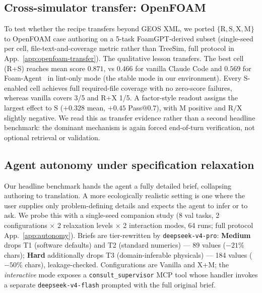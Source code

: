 \documentclass{article}
\begin{document}
\subsection{Cross-simulator transfer: OpenFOAM}
\label{subsec:openfoam-transfer}

To test whether the recipe transfers beyond GEOS XML, we ported $\{\mathrm{R,S,X,M}\}$ to OpenFOAM case authoring on a 5-task FoamGPT-derived subset (single-seed per cell, file-text-and-coverage metric rather than TreeSim, full protocol in App.~\ref{app:openfoam-transfer}). The qualitative lesson transfers. The best cell (R+S) reaches mean score $0.871$, vs $0.466$ for vanilla Claude Code and $0.569$ for Foam-Agent~\citep{foamagent2025} in lint-only mode (the stable mode in our environment). Every $\mathrm{S}$-enabled cell achieves full required-file coverage with no zero-score failures, whereas vanilla covers 3/5 and R+X 1/5. A factor-style readout assigns the largest effect to $\mathrm{S}$ ($+0.328$ mean, $+0.45$ Pass@0.7), with $\mathrm{M}$ positive and $\mathrm{R}/\mathrm{X}$ slightly negative. We read this as transfer evidence rather than a second headline benchmark: the dominant mechanism is again forced end-of-turn verification, not optional retrieval or validation.

\subsection{Agent autonomy under specification relaxation}
\label{subsec:autonomy}

Our headline benchmark hands the agent a fully detailed brief, collapsing authoring to translation. A more ecologically realistic setting is one where the user supplies only problem-defining details and expects the agent to infer or to ask. We probe this with a single-seed companion study (8 val tasks, 2 configurations $\times$ 2 relaxation levels $\times$ 2 interaction modes, 64 runs; full protocol App.~\ref{app:autonomy}). Briefs are tier-rewritten by \texttt{deepseek-v4-pro}: \textbf{Medium} drops T1 (software defaults) and T2 (standard numerics) — 89 values ($-21\%$ chars); \textbf{Hard} additionally drops T3 (domain-inferable physicals) — 184 values ($-50\%$ chars), leakage-checked. Configurations are Vanilla and X+M; the \emph{interactive} mode exposes a \texttt{consult\_supervisor} MCP tool whose handler invokes a separate \texttt{deepseek-v4-flash} prompted with the full original brief.
\end{document}
